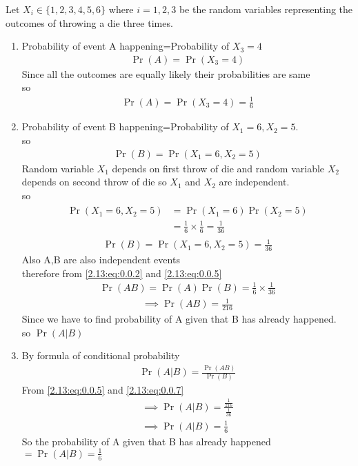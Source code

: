 Let $X_i \in \{1,2,3,4,5,6\}$ where $i=1,2,3$
be the random variables representing the outcomes of throwing a die three times.\\
\begin{enumerate}
\item Probability of event A happening=Probability of $X_3=4$
\begin{align}
    \Pr{(A)}=\Pr{(X_3=4)}
\end{align}
Since all the outcomes are equally likely their probabilities are same \\
so
\begin{align}
    \Pr{(A)}=\Pr{(X_3=4)}=\frac{1}{6}
    \label{2.13:eq:0.0.2}
\end{align}
\item Probability of event B happening=Probability of $X_1=6,X_2=5$.\\
so
\begin{align}
    \Pr{(B)}=\Pr{(X_1=6,X_2=5)}
\end{align}
Random variable $X_1$ depends on first throw of die and random variable $X_2$ depends on second throw of die so $X_1$ and $X_2$ are independent.\\
so 
\begin{align}
\begin{split}
    \Pr{(X_1=6,X_2=5)} &=\Pr{(X_1=6)} \Pr{(X_2=5)}\\
   &=\frac{1}{6}\times \frac{1}{6}=\frac{1}{36}
   \end{split}
\end{align}
\begin{align}
    \Pr{(B)}=\Pr{(X_1=6,X_2=5)}=\frac{1}{36}
    \label{2.13:eq:0.0.5}
\end{align}
Also A,B are also independent events \\
therefore  from \eqref{2.13:eq:0.0.2} and \eqref{2.13:eq:0.0.5}
\begin{align}
    \Pr{(AB)} = \Pr{(A)} \Pr{(B)}
     =\frac{1}{6} \times \frac{1}{36}
    \end{align}
    \begin{align}
 \implies  \Pr{(AB)}=\frac{1}{216}\label{2.13:eq:0.0.7}
\end{align}
Since we have to find probability of A given that B has already happened.\\
so $\Pr{(A|B)}$\\
\item By formula of conditional probability
\begin{align}
    \Pr{(A|B)}=\frac{\Pr{(AB)}}{\Pr{(B)}}
    \end{align}
    From \eqref{2.13:eq:0.0.5} and \eqref{2.13:eq:0.0.7} 
    \begin{align}  
    \implies
    \Pr{(A|B)}=\frac{\frac{1}{216}}{\frac{1}{36}}\\
    \implies
    \Pr{(A|B)}=\frac{1}{6}
    \end{align}
    So the probability of A given that B has already happened $=\Pr{(A|B)}=\frac{1}{6}$
\end{enumerate}